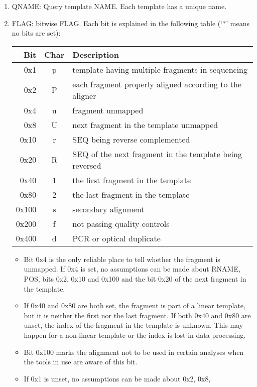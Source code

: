 \documentclass[10pt]{article}
\begin{document}
\begin{enumerate}
\item {\sf QNAME}: Query template NAME. Each template has a unique name.
\item {\sf FLAG}: bitwise FLAG. Each bit is explained in the following
  table (`*' means no bits are set):
  \begin{center}\small
  \begin{tabular}{rcl}
  \hline
  Bit & Char & Description\\
  \hline
  0x1 & p & template having multiple fragments in sequencing \\
  0x2 & P & each fragment properly aligned according to the aligner \\
  0x4 & u & fragment unmapped \\
  0x8 & U & next fragment in the template unmapped \\
  0x10 & r & {\sf SEQ} being reverse complemented \\
  0x20 & R & {\sf SEQ} of the next fragment in the template being reversed \\
  0x40 & 1 & the first fragment in the template \\
  0x80 & 2 & the last fragment in the template \\
  0x100 & s & secondary alignment\\
  0x200 & f & not passing quality controls \\
  0x400 & d & PCR or optical duplicate \\
  \hline
  \end{tabular}
  \end{center}
  \begin{itemize}
  \item Bit 0x4 is the only reliable place to tell whether the fragment
    is unmapped. If 0x4 is set, no assumptions can be made about {\sf
      RNAME}, {\sf POS}, bits 0x2, 0x10 and 0x100 and the bit 0x20 of
    the next fragment in the template.
  \item If 0x40 and 0x80 are both set, the fragment is part of a linear
    template, but it is neither the first nor the last fragment. If both
    0x40 and 0x80 are unset, the index of the fragment in the template
    is unknown. This may happen for a non-linear template or the index
    is lost in data processing.
  \item Bit 0x100 marks the alignment not to be used in certain analyses
    when the tools in use are aware of this bit.
  \item If 0x1 is unset, no assumptions can be made about 0x2, 0x8,

\end{itemize}
\end{enumerate}
\end{document}
